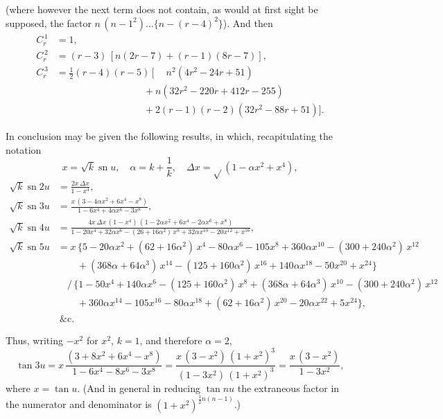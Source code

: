\documentclass[12pt,a4paper]{article}
\theoremstyle{plain}
\DeclareMathOperator{\sn}{sn}
\begin{document}
(where however the next term does not contain, as would at first sight be supposed, the factor $n\,(n-1^2) \ldots \{n-(r-4)^2\}$). And then
\begin{align*}
C_r^{\,1} &= 1, \\
C_r^{\,2} &= (r-3)\,[n(2r-7) + (r-1)(8r-7)], \\
C_r^{\,3} &= \tfrac{1}{2}(r-4)(r-5)\,[\phantom{+}n^2(4r^2 - 24r + 51) \\
  &\qquad\qquad\qquad\qquad\quad + n(32r^2 - 220r + 412r - 255) \\
  &\qquad\qquad\qquad\qquad\quad + 2(r-1)(r-2)(32r^2 - 88r + 51)].
\end{align*}


In conclusion may be given the following results, in which, recapitulating the notation
\[
x = \sqrt{k} \sn u, \quad \alpha = k + \frac{1}{k}, \quad \Delta x = \sqrt{}(1 - \alpha x^2 + x^4),
\]
\begin{align*}
\sqrt{k} \sn 2u &= \frac{2x\,\Delta x}{1 - x^4}, \\[4pt]
\sqrt{k} \sn 3u &= \frac{x\,(3 - 4\alpha x^2 + 6x^4 - x^8)}{1 - 6x^4 + 4\alpha x^6 - 3x^8}, \\[6pt]
\sqrt{k} \sn 4u &= \frac{4x\,\Delta x\,(1 - x^4)\,(1 - 2\alpha x^2 + 6x^4 - 2\alpha x^6 + x^8)}{1 - 20x^4 + 32\alpha x^6 - (26 + 16\alpha^2)\,x^8 + 32\alpha x^{10} - 20x^{12} + x^{16}}, \\[6pt]
\sqrt{k} \sn 5u &= x\,\{5 - 20\alpha x^2 + (62 + 16\alpha^2)\,x^4 - 80\alpha x^6 - 105x^8 + 360\alpha x^{10} - (300 + 240\alpha^2)\,x^{12} \\
  &\qquad + (368\alpha + 64\alpha^3)\,x^{14} - (125 + 160\alpha^2)\,x^{16} + 140\alpha x^{18} - 50x^{20} + x^{24}\} \\
  &\quad /\,\{1 - 50x^4 + 140\alpha x^6 - (125 + 160\alpha^2)\,x^8 + (368\alpha + 64\alpha^3)\,x^{10} - (300 + 240\alpha^2)\,x^{12} \\
  &\qquad + 360\alpha x^{14} - 105x^{16} - 80\alpha x^{18} + (62 + 16\alpha^2)\,x^{20} - 20\alpha x^{22} + 5x^{24}\}, \\
  &\ \&\text{c.}
\end{align*}

Thus, writing $-x^2$ for $x^2$, $k = 1$, and therefore $\alpha = 2$,
\[
\tan 3u = x\,\frac{(3 + 8x^2 + 6x^4 - x^8)}{1 - 6x^4 - 8x^6 - 3x^8} = \frac{x\,(3-x^2)\,(1+x^2)^3}{(1-3x^2)\,(1+x^2)^3} = \frac{x\,(3-x^2)}{1-3x^2},
\]
where $x = \tan u$. (And in general in reducing $\tan nu$ the extraneous factor in the numerator and denominator is $(1+x^2)^{\frac{1}{2}n(n-1)}$.)
\end{document}
